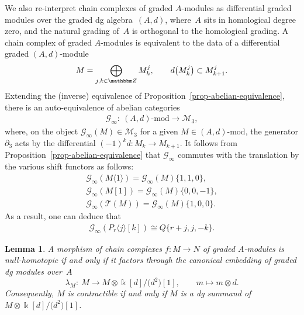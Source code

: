 \documentclass[pdftex]{sigma}
\newtheorem{lem}[thm]{Lemma}
\theoremstyle{definition}
\numberwithin{equation}{section}
\def\Z{{\mathbbm Z}}
\def\dif{\partial}
\def\lra{{\longrightarrow}}
\def\dmod{{\mathrm{\mbox{-}mod}}} %
\def\mc{\mathcal}
\begin{document}
We also re-interpret chain complexes of graded $A$-modules as differential graded modules over the graded dg algebra~$(A, d)$, where~$A$ sits in homological degree zero, and the natural grading of~$A$ is orthogonal to the homological grading. A chain complex of graded $A$-modules is equivalent to the data of a differential graded $(A,d)$-module
\begin{gather*}M=\bigoplus_{j,k\in \Z}M^j_{k},\qquad d\big(M_{k}^j\big)\subset M_{k+1}^j.\end{gather*}
Extending the (inverse) equivalence of Proposition~\ref{prop-abelian-equivalence}, there is an auto-equivalence of abelian categories
\begin{gather*}%
\mc{G}_\infty\colon \ (A,d)\dmod \lra \mc{M}_3,
\end{gather*}
where, on the object $\mc{G}_\infty(M)\in \mc{M}_3$ for a given $M\in (A,d)\dmod$, the generator $\dif_3$ acts by the differential $(-1)^k d\colon M_{k}\lra M_{k+1}$. It follows from Proposition~\ref{prop-abelian-equivalence} that $\mc{G}_\infty$ commutes with the translation by the various shift functors as follows:
\begin{gather}
 \mc{G}_\infty (M\langle 1 \rangle) = \mc{G}_\infty(M)\{1,1,0\}, \nonumber\\
 \mc{G}_\infty(M[1]) = \mc{G}_\infty (M)\{0,0,-1\}, \nonumber\\
 \mc{G}_\infty (\mc{T}(M)) = \mc{G}_\infty(M)\{1,0,0\}.\label{eqn-G-commute-with-grading-shifts}
\end{gather}
As a result, one can deduce that
\begin{gather}\label{eqn-G-on-Pr}
 \mc{G}_\infty(P_r\langle j \rangle[k])\cong Q\{r+j,j,-k\}.
\end{gather}

\begin{lem}\label{lem-contractible-dg-mod}
A morphism of chain complexes $f\colon M \lra N$ of graded $A$-modules is null-homotopic if and only if it factors through the canonical embedding of graded dg modules over~$A$
\[
\lambda_M \colon \ M\lra M\otimes \Bbbk[d]/\big(d^2\big)[1],\qquad m\mapsto m\otimes d.
\]
Consequently, $M$ is contractible if and only if $M$ is a dg summand of $M\otimes \Bbbk[d]/\big(d^2\big)[1]$.
\end{lem}
\end{document}
